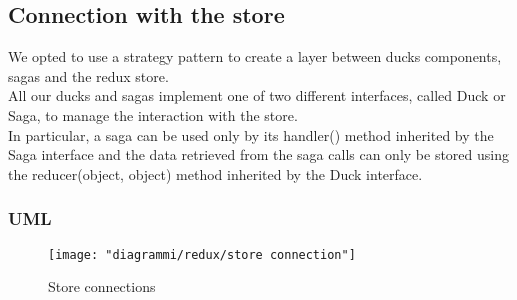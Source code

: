 
	\subsection{Connection with the store}
	We opted to use a strategy pattern to create a layer between ducks components, sagas and the redux store.\\
	All our ducks and sagas implement one of two different interfaces, called Duck or Saga, to manage the interaction with the store.\\
	In particular, a saga can be used only by its handler() method inherited by the Saga interface
	and the data retrieved from the saga calls can only be stored using the reducer(object, object) method inherited by the Duck interface.
	\subsubsection{UML}
	\begin{figure}[H]
		\centering
		\texttt{[image: "diagrammi/redux/store connection"]}
		\caption{Store connections}
		\label{fig:Store connections}
	\end{figure}
	
